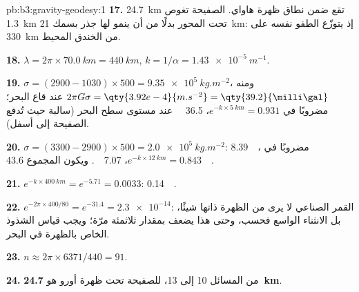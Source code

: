 \begin{solution}{pb:b3:gravity-geodesy:1}
\textbf{17.} \qty{24.7}{km} تقع ضمن نطاق ظهرة هاواي. الصفيحة
تغوص \qty{1.3}{km} تحت المحور بدلًا من أن ينمو لها جذر بسمك
\qty{21}{km}: إذ يتوزّع الطفو نفسه على \qty{330}{km} من الخندق المحيط.

\textbf{18.} $\lambda = 2\pi\times\qty{70.0}{km} = \qty{440}{km}$,
$k = 1/\alpha = \qty{1.43e-5}{m^{-1}}$.

\textbf{19.} $\sigma = (2900 - 1030)\times500 = \qty{9.35e5}{kg.m^{-2}}$، ومنه
$2\pi G\sigma = \qty{3.92e-4}{m.s^{-2}} = \qty{39.2}{\milli\gal}$ عند قاع البحر؛
مضروبًا في $e^{-k\times\qty{5}{km}} = 0.931$، \qty{36.5}{\milli\gal} عند مستوى سطح البحر
(سالبة حيث تُدفع الصفيحة إلى أسفل).

\textbf{20.} $\sigma = (3300 - 2900)\times500 = \qty{2.0e5}{kg.m^{-2}}$:
\qty{8.39}{\milli\gal}، مضروبًا في $e^{-k\times\qty{12}{km}} = 0.843$،
\qty{7.07}{\milli\gal}. ويكون المجموع \qty{43.6}{\milli\gal}.

\textbf{21.} $e^{-k\times\qty{400}{km}} = e^{-5.71} = 0.0033$: \qty{0.14}{\milli\gal}.

\textbf{22.} $e^{-2\pi\times400/80} = e^{-31.4} = \num{2.3e-14}$: القمر الصناعي
لا يرى من الظهرة ذاتها شيئًا، بل الانثناء الواسع فحسب، وحتى هذا
يضعف بمقدار ثلاثمئة مرّة؛ ويجب قياس الشذوذ الخاص بالظهرة في البحر.

\textbf{23.} $n \approx 2\pi\times6371/440 = 91$.

\textbf{24.} من المسائل 10 إلى 13،  للصفيحة
تحت ظهرة أورو هو
\textbf{\qty[text-series-to-math=true]{24.7}{km}}.
\end{solution}
